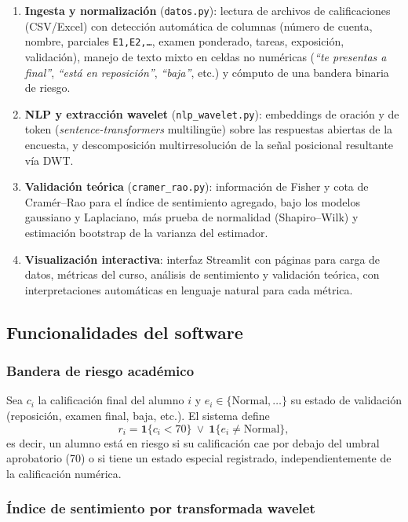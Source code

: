\documentclass[11pt,a4paper,oneside]{article}
\theoremstyle{definition}
\begin{document}
\begin{enumerate}[leftmargin=1.4em]
  \item \textbf{Ingesta y normalización} (\texttt{datos.py}): lectura de archivos de
  calificaciones (CSV/Excel) con detección automática de columnas (número de cuenta, nombre,
  parciales \texttt{E1,E2,\dots}, examen ponderado, tareas, exposición, validación), manejo de
  texto mixto en celdas no numéricas (\emph{``te presentas a final''}, \emph{``está en
  reposición''}, \emph{``baja''}, etc.) y cómputo de una bandera binaria de riesgo.
  \item \textbf{NLP y extracción wavelet} (\texttt{nlp\_wavelet.py}): embeddings de oración y de
  token (\emph{sentence-transformers} multilingüe) sobre las respuestas abiertas de la encuesta,
  y descomposición multirresolución de la señal posicional resultante vía DWT.
  \item \textbf{Validación teórica} (\texttt{cramer\_rao.py}): información de Fisher y cota de
  Cramér--Rao para el índice de sentimiento agregado, bajo los modelos gaussiano y Laplaciano,
  más prueba de normalidad (Shapiro--Wilk) y estimación bootstrap de la varianza del estimador.
  \item \textbf{Visualización interactiva}: interfaz Streamlit con páginas para carga de datos,
  métricas del curso, análisis de sentimiento y validación teórica, con interpretaciones
  automáticas en lenguaje natural para cada métrica.
\end{enumerate}

\subsection{Funcionalidades del software}
\label{sec:funcionalidades}

\subsubsection{Bandera de riesgo académico}

Sea $c_i$ la calificación final del alumno $i$ y $e_i\in\{\text{Normal},\ldots\}$ su estado de
validación (reposición, examen final, baja, etc.). El sistema define
\[
r_i = \mathbf{1}\{c_i < 70\} \ \vee\ \mathbf{1}\{e_i \neq \text{Normal}\},
\]
es decir, un alumno está en riesgo si su calificación cae por debajo del umbral aprobatorio
(70) o si tiene un estado especial registrado, independientemente de la calificación numérica.

\subsubsection{Índice de sentimiento por transformada wavelet}
\label{sec:indice}
\end{document}
